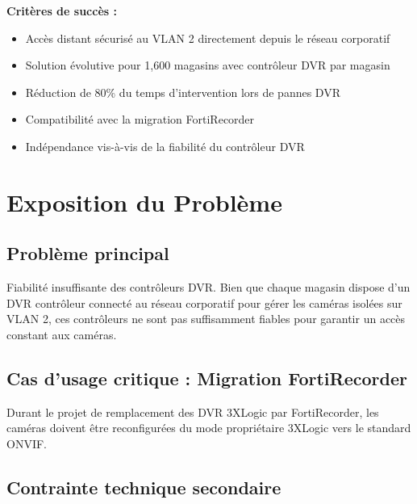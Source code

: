 \documentclass{dollarama}
\begin{document}
\vspace{1em}
\noindent\textbf{Critères de succès :}
\begin{itemize}
\item Accès distant sécurisé au VLAN 2 directement depuis le réseau corporatif
\item Solution évolutive pour 1,600 magasins avec contrôleur DVR par magasin
\item Réduction de 80\% du temps d'intervention lors de pannes DVR
\item Compatibilité avec la migration FortiRecorder
\item Indépendance vis-à-vis de la fiabilité du contrôleur DVR
\end{itemize}


\section{Exposition du Problème}


\subsection{Problème principal} 
Fiabilité insuffisante des contrôleurs DVR. Bien que chaque magasin dispose d'un DVR contrôleur connecté au réseau corporatif pour gérer les caméras isolées sur VLAN 2, ces contrôleurs ne sont pas suffisamment fiables pour garantir un accès constant aux caméras.


\subsection{Cas d'usage critique : Migration FortiRecorder}

Durant le projet de remplacement des DVR 3XLogic par FortiRecorder, les caméras doivent être reconfigurées du mode propriétaire 3XLogic vers le standard ONVIF. 


\subsection{Contrainte technique secondaire}
\end{document}
